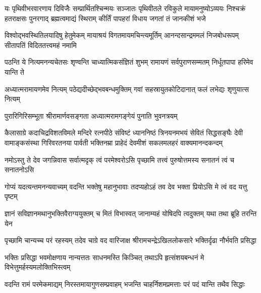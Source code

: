 

\fourlineindentedshloka
{यः पृथिवीभरवारणाय दिविजैः सम्प्रार्थितश्चिन्मयः}
{सञ्जातः पृथिवीतले रविकुले मायामनुष्योऽव्ययः}
{निश्चक्रं हतराक्षसः पुनरगाद् ब्रह्मत्वमाद्यं स्थिराम्}
{कीर्तिं पापहरां विधाय जगतां तं जानकीशं भजे} %

\fourlineindentedshloka
{विश्वोद्भवस्थितिलयादिषु हेतुमेकम्}
{मायाश्रयं विगतमायमचिन्त्यमूर्तिम्}
{आनन्दसान्द्रममलं निजबोधरूपम्}
{सीतापतिं विदिततत्त्वमहं नमामि} %

\fourlineindentedshloka
{पठन्ति ये नित्यमनन्यचेतसः}
{शृण्वन्ति चाध्यात्मिकसंज्ञितं शुभम्}
{रामायणं सर्वपुराणसम्मतम्}
{निर्धूतपापा हरिमेव यान्ति ते} %

\fourlineindentedshloka
{अध्यात्मरामायणमेव नित्यम्}
{पठेद्यदीच्छेद्भवबन्धमुक्तिम्}
{गवां सहस्रायुतकोटिदानात्}
{फलं लभेद्यः शृणुयात्स नित्यम्} %

\twolineshloka
{पुरारिगिरिसम्भूता श्रीरामार्णवसङ्गता}
{अध्यात्मरामगङ्गेयं पुनाति भुवनत्रयम्} %

\fourlineindentedshloka
{कैलासाग्रे कदाचिद्रविशतविमले मन्दिरे रत्नपीठे}
{संविष्टं ध्याननिष्ठं त्रिनयनमभयं सेवितं सिद्धसङ्घैः}
{देवी वामाङ्कसंस्था गिरिवरतनया पार्वती भक्तिनम्रा}
{प्राहेदं देवमीशं सकलमलहरं वाक्यमानन्दकन्दम्} %


\fourlineindentedshloka
{नमोऽस्तु ते देव जगन्निवास}
{सर्वात्मदृक् त्वं परमेश्वरोऽसि}
{पृच्छामि तत्त्वं पुरुषोत्तमस्य}
{सनातनं त्वं च सनातनोऽसि} %

\fourlineindentedshloka
{गोप्यं यदत्यन्तमनन्यवाच्यम्}
{वदन्ति भक्तेषु महानुभावाः}
{तदप्यहोऽहं तव देव भक्ता}
{प्रियोऽसि मे त्वं वद यत्तु पृष्टम्} %

\fourlineindentedshloka
{ज्ञानं सविज्ञानमथानुभक्तिवैराग्ययुक्तम्}
{च मितं विभास्वत्}
{जानाम्यहं योषिदपि त्वदुक्तम्}
{यथा तथा ब्रूहि तरन्ति येन} %

\fourlineindentedshloka
{पृच्छामि चान्यच्च परं रहस्यम्}
{तदेव चाग्रे वद वारिजाक्ष}
{श्रीरामचन्द्रेऽखिललोकसारे}
{भक्तिर्दृढा नौर्भवति प्रसिद्धा} %

\fourlineindentedshloka
{भक्तिः प्रसिद्धा भवमोक्षणाय}
{नान्यत्ततः साधनमस्ति किञ्चित्}
{तथाऽपि हृत्संशयबन्धनं मे}
{विभेत्तुमर्हस्यमलोक्तिभिस्त्वम्} %

\fourlineindentedshloka
{वदन्ति रामं परमेकमाद्यम्}
{निरस्तमायागुणसम्प्रवाहम्}
{भजन्ति चाहर्निशमप्रमत्ताः}
{परं पदं यान्ति तथैव सिद्धाः} %

